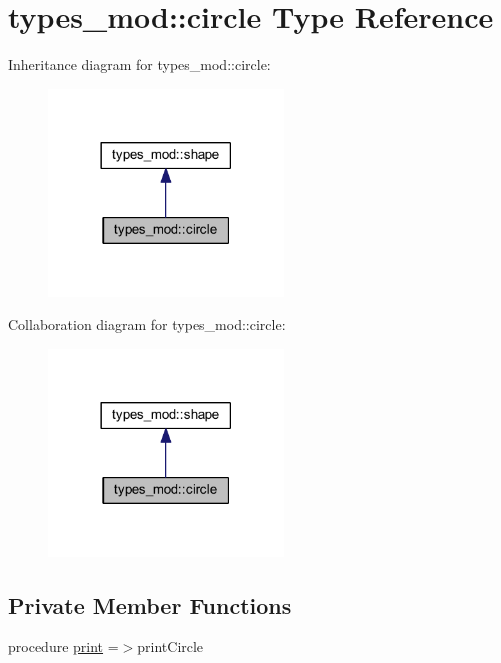 \hypertarget{structtypes__mod_1_1circle}{}\section{types\+\_\+mod\+:\+:circle Type Reference}
\label{structtypes__mod_1_1circle}


Inheritance diagram for types\+\_\+mod\+:\+:circle\+:
\nopagebreak
\begin{figure}[H]
\begin{center}
\leavevmode
\includegraphics[width=177pt]{structtypes__mod_1_1circle__inherit__graph}
\end{center}
\end{figure}


Collaboration diagram for types\+\_\+mod\+:\+:circle\+:
\nopagebreak
\begin{figure}[H]
\begin{center}
\leavevmode
\includegraphics[width=177pt]{structtypes__mod_1_1circle__coll__graph}
\end{center}
\end{figure}
\subsection*{Private Member Functions}
\begin{DoxyCompactItemize}
\item 
procedure \hyperlink{structtypes__mod_1_1circle_a69b68a4eba0ef69a0301786ef11b48fe}{print} =$>$print\+Circle
\end{DoxyCompactItemize}
